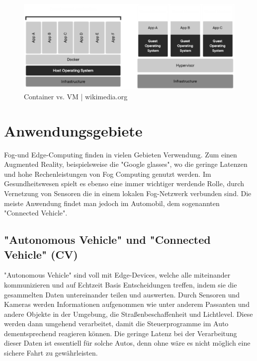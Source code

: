 \documentclass[10pt, a4paper, twocolumn]{article}
\begin{document}
\begin{figure}[H]
	\centering
	\includegraphics[scale=0.4]{Tech.eps}
	\caption{Container vs. VM | wikimedia.org}
\end{figure}

\section{Anwendungsgebiete}
Fog-und Edge-Computing finden in vielen Gebieten Verwendung. Zum einen Augmented Reality, beispielsweise die "Google glasses", wo die geringe Latenzen und hohe Rechenleistungen von Fog Computing genutzt werden. Im Gesundheitswesen spielt es ebenso eine immer wichtiger werdende Rolle, durch Vernetzung von Sensoren die in einem lokalen Fog-Netzwerk verbunden sind. Die meiste Anwendung findet man jedoch im Automobil, dem sogenannten "Connected Vehicle".

\subsection{"Autonomous Vehicle" und "Connected Vehicle" (CV)}
"Autonomous Vehicle" sind voll mit Edge-Devices, welche alle miteinander kommunizieren und auf Echtzeit Basis Entscheidungen treffen, indem sie die gesammelten Daten untereinander teilen und auswerten. Durch Sensoren und Kameras werden Informationen aufgenommen wie unter anderem Passanten und andere Objekte in der Umgebung, die Straßenbeschaffenheit und Lichtlevel. Diese werden dann umgehend verarbeitet, damit die Steuerprogramme im Auto dementsprechend reagieren können. 
Die geringe Latenz bei der Verarbeitung dieser Daten ist essentiell für solche Autos, denn ohne wäre es nicht möglich eine sichere Fahrt zu gewährleisten.
\end{document}
